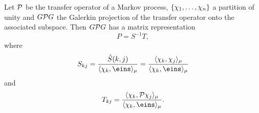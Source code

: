 \begin{thm}
\label{thm:galerkin}
Let $\mathcal{P}$ be the transfer operator of a Markov process, $\{ \chi_1,\dots,\chi_n \}$ a partition of unity and $G\mathcal{P} G$ the Galerkin projection of the transfer operator onto the associated subspace. 
Then $G\mathcal{P} G$ has a matrix representation
\begin{equation*}
P = S^{-1}T,
\end{equation*}
where
\begin{equation}
\label{eq:massmatrix}
S_{kj} =  \frac{\hat{S}(k,j)}{\langle \chi_k, \eins \rangle_\mu}
= \frac{\langle \chi_k, \chi_j \rangle_\mu}{\langle \chi_k, \eins \rangle_\mu}
\end{equation}
and 
\begin{equation}
T_{kj} = \frac{\langle \chi_k, \Pcal \chi_j \rangle_\mu}{\langle \chi_k, \eins \rangle_\mu}.
\end{equation}
\end{thm}

